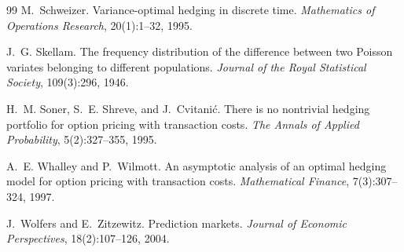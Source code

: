 \documentclass[11pt,a4paper]{article}
\theoremstyle{plain}
\theoremstyle{definition}
\theoremstyle{remark}
\newcommand{\1}{\mathbf{1}}
\begin{document}
\begin{thebibliography}{99}
M.~Schweizer.
\newblock Variance-optimal hedging in discrete time.
\newblock \emph{Mathematics of Operations Research}, 20(1):1--32, 1995.

J.~G. Skellam.
\newblock The frequency distribution of the difference between two Poisson variates belonging to different populations.
\newblock \emph{Journal of the Royal Statistical Society}, 109(3):296, 1946.

H.~M. Soner, S.~E. Shreve, and J.~Cvitanić.
\newblock There is no nontrivial hedging portfolio for option pricing with transaction costs.
\newblock \emph{The Annals of Applied Probability}, 5(2):327--355, 1995.

A.~E. Whalley and P.~Wilmott.
\newblock An asymptotic analysis of an optimal hedging model for option pricing with transaction costs.
\newblock \emph{Mathematical Finance}, 7(3):307--324, 1997.

J.~Wolfers and E.~Zitzewitz.
\newblock Prediction markets.
\newblock \emph{Journal of Economic Perspectives}, 18(2):107--126, 2004.

\end{thebibliography}
\end{document}

